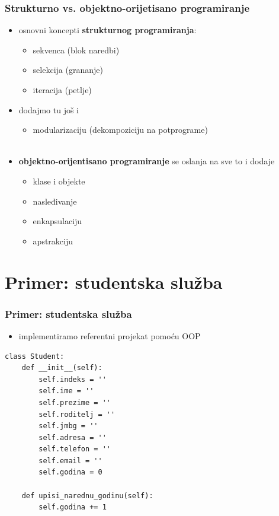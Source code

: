 \documentclass[utf8,compress,aspectratio=169]{beamer}
\begin{document}
\begin{frame}[fragile]
  \frametitle{Strukturno vs. objektno-orijetisano programiranje}
  \begin{itemize}
    \item osnovni koncepti \textbf{strukturnog programiranja}:
    \begin{itemize}
      \item sekvenca (blok naredbi)
      \item selekcija (grananje)
      \item iteracija (petlje)
    \end{itemize}
    \item dodajmo tu još i
    \begin{itemize}
      \item modularizaciju (dekompoziciju na potprograme) \\ \ \\
    \end{itemize}
    \item \textbf{objektno-orijentisano programiranje} se oslanja na sve to i dodaje
    \begin{itemize}
      \item klase i objekte
      \item nasleđivanje
      \item enkapsulaciju
      \item apstrakciju
    \end{itemize}
  \end{itemize}
\end{frame}

\section[Primer]{Primer: studentska služba}

\begin{frame}[fragile]
  \frametitle{Primer: studentska služba}
  \begin{itemize}
    \item implementiramo referentni projekat pomoću OOP
  \end{itemize}
\begin{verbatim}
class Student:
    def __init__(self):
        self.indeks = ''
        self.ime = ''
        self.prezime = ''
        self.roditelj = ''
        self.jmbg = ''
        self.adresa = ''
        self.telefon = ''
        self.email = ''
        self.godina = 0

    def upisi_narednu_godinu(self):
        self.godina += 1

\end{verbatim}
\end{frame}
\end{document}
